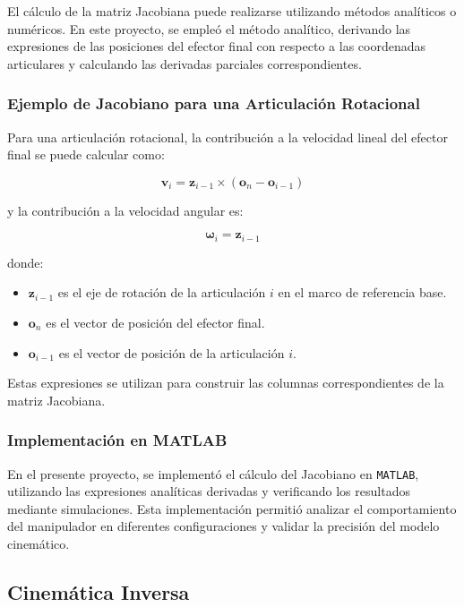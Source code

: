 El cálculo de la matriz Jacobiana puede realizarse utilizando métodos analíticos o numéricos. En este proyecto, se empleó el método analítico, derivando las expresiones de las posiciones del efector final con respecto a las coordenadas articulares y calculando las derivadas parciales correspondientes.

\subsubsection{Ejemplo de Jacobiano para una Articulación Rotacional}

Para una articulación rotacional, la contribución a la velocidad lineal del efector final se puede calcular como:

\[
\mathbf{v}_i = \mathbf{z}_{i-1} \times (\mathbf{o}_n - \mathbf{o}_{i-1})
\]

y la contribución a la velocidad angular es:

\[
\boldsymbol{\omega}_i = \mathbf{z}_{i-1}
\]

donde:
\begin{itemize}
	\item $\mathbf{z}_{i-1}$ es el eje de rotación de la articulación $i$ en el marco de referencia base.
	\item $\mathbf{o}_n$ es el vector de posición del efector final.
	\item $\mathbf{o}_{i-1}$ es el vector de posición de la articulación $i$.
\end{itemize}

Estas expresiones se utilizan para construir las columnas correspondientes de la matriz Jacobiana.

\subsubsection{Implementación en MATLAB}

En el presente proyecto, se implementó el cálculo del Jacobiano en \texttt{MATLAB}, utilizando las expresiones analíticas derivadas y verificando los resultados mediante simulaciones. Esta implementación permitió analizar el comportamiento del manipulador en diferentes configuraciones y validar la precisión del modelo cinemático.



\subsection{Cinemática Inversa}

